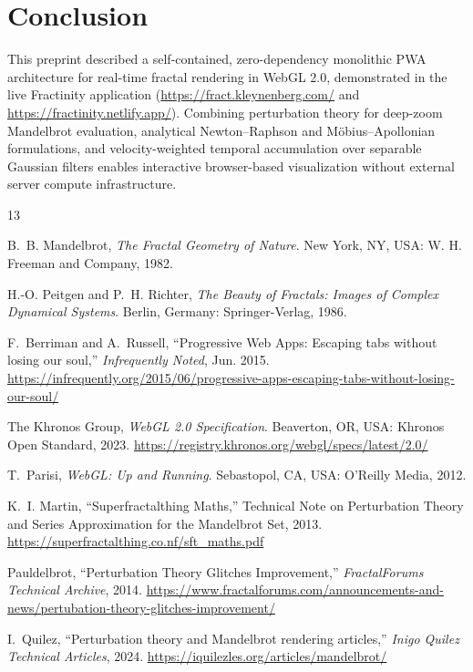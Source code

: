 \documentclass[11pt, a4paper]{article}
\begin{document}
\section{Conclusion}

This preprint described a self-contained, zero-dependency monolithic PWA architecture for real-time fractal rendering in WebGL 2.0, demonstrated in the live Fractinity application (\url{https://fract.kleynenberg.com/} and \url{https://fractinity.netlify.app/}). Combining perturbation theory for deep-zoom Mandelbrot evaluation, analytical Newton--Raphson and M\"obius--Apollonian formulations, and velocity-weighted temporal accumulation over separable Gaussian filters enables interactive browser-based visualization without external server compute infrastructure.

\begin{thebibliography}{13}

B.~B. Mandelbrot, \emph{The Fractal Geometry of Nature}. New York, NY, USA: W. H. Freeman and Company, 1982.

H.-O. Peitgen and P.~H. Richter, \emph{The Beauty of Fractals: Images of Complex Dynamical Systems}. Berlin, Germany: Springer-Verlag, 1986.

F.~Berriman and A.~Russell, ``Progressive Web Apps: Escaping tabs without losing our soul,'' \emph{Infrequently Noted}, Jun. 2015. \url{https://infrequently.org/2015/06/progressive-apps-escaping-tabs-without-losing-our-soul/}

The Khronos Group, \emph{WebGL 2.0 Specification}. Beaverton, OR, USA: Khronos Open Standard, 2023. \url{https://registry.khronos.org/webgl/specs/latest/2.0/}

T.~Parisi, \emph{WebGL: Up and Running}. Sebastopol, CA, USA: O'Reilly Media, 2012.

K.~I. Martin, ``Superfractalthing Maths,'' Technical Note on Perturbation Theory and Series Approximation for the Mandelbrot Set, 2013. \url{https://superfractalthing.co.nf/sft_maths.pdf}

Pauldelbrot, ``Perturbation Theory Glitches Improvement,'' \emph{FractalForums Technical Archive}, 2014. \url{https://www.fractalforums.com/announcements-and-news/pertubation-theory-glitches-improvement/}

I.~Quilez, ``Perturbation theory and Mandelbrot rendering articles,'' \emph{Inigo Quilez Technical Articles}, 2024. \url{https://iquilezles.org/articles/mandelbrot/}


\end{thebibliography}
\end{document}
